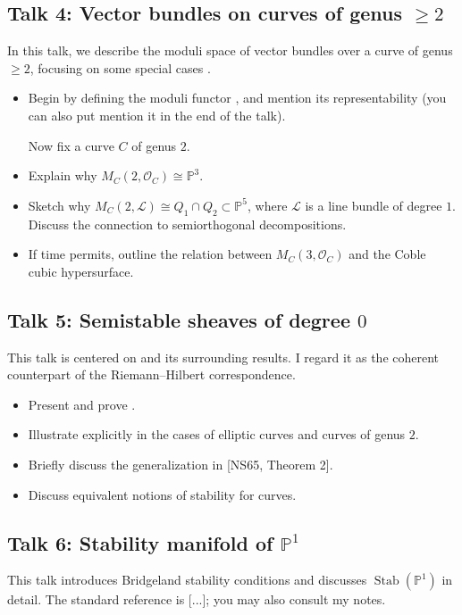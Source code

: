 \documentclass[UTF8]{amsart}
\numberwithin{equation}{section}
\theoremstyle{plain}
\numberwithin{equation}{section}
\theoremstyle{remark}
\DeclareMathOperator{\Stab}{\operatorname{Stab}}
\begin{document}
\subsection*{Talk 4: Vector bundles on curves of genus $\geqslant 2$}\cite[2.3 \& 2.5]{MS19}
In this talk, we describe the moduli space of vector bundles over a curve of genus $\geqslant 2$, focusing on some special cases \cite[Examples 2.18–2.20]{MS19}.

\begin{itemize}
\item Begin by defining the moduli functor \cite[Definition 2.9]{MS19}, and mention its representability \cite[Theorem 2.10]{MS19} (you can also put mention it in the end of the talk).

\noindent \hspace{-8mm} Now fix a curve $C$ of genus $2$.
\item Explain why $M_C(2, \mathcal{O}_C) \cong \mathbb{P}^3$.
\item Sketch why $M_C(2, \mathcal{L}) \cong Q_1 \cap Q_2 \subset \mathbb{P}^5$, where $\mathcal{L}$ is a line bundle of degree $1$. Discuss the connection to semiorthogonal decompositions.
\item If time permits, outline the relation between $M_C(3, \mathcal{O}_C)$ and the Coble cubic hypersurface.
\end{itemize}

\subsection*{Talk 5: Semistable sheaves of degree $0$}\cite[2.4]{MS19}
This talk is centered on \cite[Theorem 2.14]{MS19} and its surrounding results. I regard it as the coherent counterpart of the Riemann--Hilbert correspondence.

\begin{itemize}
\item Present and prove \cite[Theorem 2.14]{MS19}.
\item Illustrate \cite[Theorem 2.14]{MS19} explicitly in the cases of elliptic curves and curves of genus $2$.
\item Briefly discuss the generalization in [NS65, Theorem 2].
\item  Discuss equivalent notions of stability for curves.
\end{itemize}

\subsection*{Talk 6: Stability manifold of $\mathbb{P}^1$}
This talk introduces Bridgeland stability conditions and discusses $\Stab(\mathbb{P}^1)$ in detail. The standard reference is [...]; you may also consult my notes.
\end{document}
